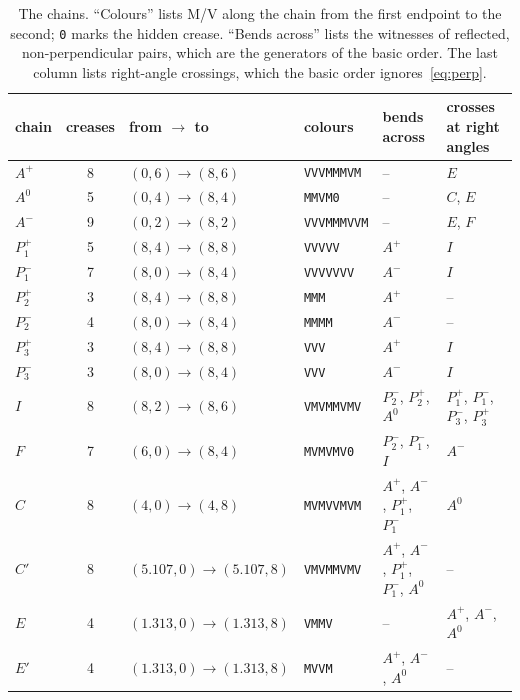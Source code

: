 \documentclass[11pt]{article}
\theoremstyle{definition}
\theoremstyle{remark}
\begin{document}
\begin{table}[t]
\centering\footnotesize\setlength{\tabcolsep}{4pt}
\begin{tabular}{lcllll}
\toprule
chain & creases & from $\to$ to & colours & bends across & crosses at right angles\\
\midrule
$A^{+}$ & 8 & $(0,6)\to(8,6)$ & \texttt{VVVMMMVM} & -- & $E$\\
$A^{0}$ & 5 & $(0,4)\to(8,4)$ & \texttt{MMVM0} & -- & $C$, $E$\\
$A^{-}$ & 9 & $(0,2)\to(8,2)$ & \texttt{VVVMMMVVM} & -- & $E$, $F$\\
$P_1^{+}$ & 5 & $(8,4)\to(8,8)$ & \texttt{VVVVV} & $A^{+}$ & $I$\\
$P_1^{-}$ & 7 & $(8,0)\to(8,4)$ & \texttt{VVVVVVV} & $A^{-}$ & $I$\\
$P_2^{+}$ & 3 & $(8,4)\to(8,8)$ & \texttt{MMM} & $A^{+}$ & --\\
$P_2^{-}$ & 4 & $(8,0)\to(8,4)$ & \texttt{MMMM} & $A^{-}$ & --\\
$P_3^{+}$ & 3 & $(8,4)\to(8,8)$ & \texttt{VVV} & $A^{+}$ & $I$\\
$P_3^{-}$ & 3 & $(8,0)\to(8,4)$ & \texttt{VVV} & $A^{-}$ & $I$\\
$I$ & 8 & $(8,2)\to(8,6)$ & \texttt{VMVMMVMV} & $P_2^{-}$, $P_2^{+}$, $A^{0}$ & $P_1^{+}$, $P_1^{-}$, $P_3^{-}$, $P_3^{+}$\\
$F$ & 7 & $(6,0)\to(8,4)$ & \texttt{MVMVMV0} & $P_2^{-}$, $P_1^{-}$, $I$ & $A^{-}$\\
$C$ & 8 & $(4,0)\to(4,8)$ & \texttt{MVMVVMVM} & $A^{+}$, $A^{-}$, $P_1^{+}$, $P_1^{-}$ & $A^{0}$\\
$C'$ & 8 & $(5.107,0)\to(5.107,8)$ & \texttt{VMVMMVMV} & $A^{+}$, $A^{-}$, $P_1^{+}$, $P_1^{-}$, $A^{0}$ & --\\
$E$ & 4 & $(1.313,0)\to(1.313,8)$ & \texttt{VMMV} & -- & $A^{+}$, $A^{-}$, $A^{0}$\\
$E'$ & 4 & $(1.313,0)\to(1.313,8)$ & \texttt{MVVM} & $A^{+}$, $A^{-}$, $A^{0}$ & --\\
\bottomrule
\end{tabular}
\caption{The chains. ``Colours'' lists M/V along the chain from the first endpoint to the second; \texttt{0} marks the hidden crease. ``Bends across'' lists the witnesses of reflected, non-perpendicular pairs, which are the generators of the basic order. The last column lists right-angle crossings, which the basic order ignores~\eqref{eq:perp}.}
\label{tab:chains}
\end{table}
\end{document}
